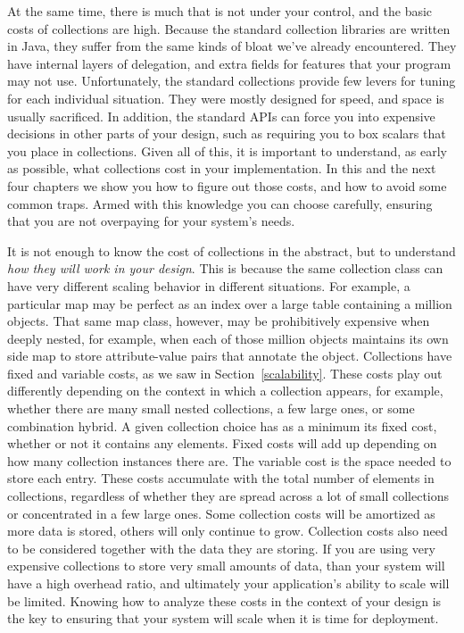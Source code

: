 At the same time, there is much that is not under your control, and the basic
costs of collections are high.  Because the standard collection libraries are
written in Java, they suffer from the same kinds of bloat we've already encountered. They have internal layers
of delegation, and extra fields for features that your program may not
use. Unfortunately, the standard collections provide few levers for
tuning for each individual situation. They were
mostly designed for speed, and space is usually sacrificed. In
addition, the standard APIs can force you into expensive decisions in other
parts of your design, such as requiring you to box scalars that you place in
collections. Given all of this, it is important to understand, as early as possible,
what collections cost in your implementation. In this and
the next four chapters we show you how to figure out those costs, and how
to avoid some common traps. Armed with this
knowledge you can choose carefully, ensuring that you are not
overpaying for your system's needs.
  
It is not enough to know the cost
of collections in the abstract, but to understand \emph{how they will work in
your design}. This is because the same collection class can have very different
scaling behavior in different situations. For example, a particular map
may be perfect as an index over a large table containing a
million objects. That same map class, however, may be prohibitively expensive
when deeply nested, for example, when each of those
million objects maintains its own side map to store attribute-value pairs that
annotate the object.
Collections have fixed and variable costs, as we saw
in Section~\ref{scalability}. These costs play out differently
depending on the context in which a collection appears, for example, whether
there are many small nested collections, a few large ones, or some combination
hybrid.  A given collection choice has as a minimum its fixed cost,
whether or not it contains any elements. Fixed costs will add up depending on
how many collection instances there are. The variable cost is the space needed to store each entry. These
 costs accumulate with the total number of
elements in collections, regardless of whether they are spread across a lot of
small collections or concentrated in a few large ones. 
Some collection costs will be amortized as more data is stored, others will only
continue to grow. Collection costs also need to be considered together with the data they are
storing. If you are using very expensive collections to store very small amounts
of data, than your system will have a high overhead ratio, and ultimately your application's ability
to scale will be limited. 
Knowing how to analyze these costs in the context of your design
is the key to ensuring that your system will scale when it is time for
deployment.  

